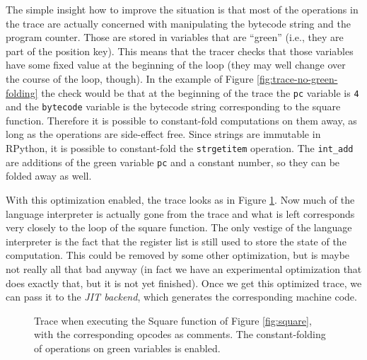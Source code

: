 \documentclass{sig-alternate}
\newcommand\ie{i.e.,\xspace}
\begin{document}
The simple insight how to improve the situation is that most of the operations
in the trace are actually concerned with manipulating the bytecode string and
the program counter. Those are stored in variables that are ``green'' (\ie they
are part of the position key).  This means that the tracer checks that those
variables have some fixed value at the beginning of the loop (they may well
change over the course of the loop, though). In the example of Figure
\ref{fig:trace-no-green-folding} the check would be that at the beginning of the
trace the \texttt{pc} variable is \texttt{4} and the \texttt{bytecode} variable
is the bytecode string corresponding to the square function. Therefore it is
possible to constant-fold computations on them away,
as long as the operations are side-effect free. Since strings are immutable in
RPython, it is possible to constant-fold the \texttt{strgetitem} operation. The
\texttt{int\_add} are additions of the green variable \texttt{pc} and a constant
number, so they can be folded away as well.

With this optimization enabled, the trace looks as in Figure
\ref{fig:trace-full}. Now much of the language interpreter is actually gone
from the trace and what is left corresponds very closely to the loop of the
square function. The only vestige of the language interpreter is the fact that
the register list is still used to store the state of the computation. This
could be removed by some other optimization, but is maybe not really all that
bad anyway (in fact we have an experimental optimization that does exactly that,
but it is not yet finished).  Once we get this optimized trace, we can pass it to
the \emph{JIT backend}, which generates the corresponding machine code.

\begin{figure}

\caption{Trace when executing the Square function of Figure \ref{fig:square},
with the corresponding opcodes as comments. The constant-folding of operations
on green variables is enabled.}
\label{fig:trace-full}
\end{figure}


\end{document}
